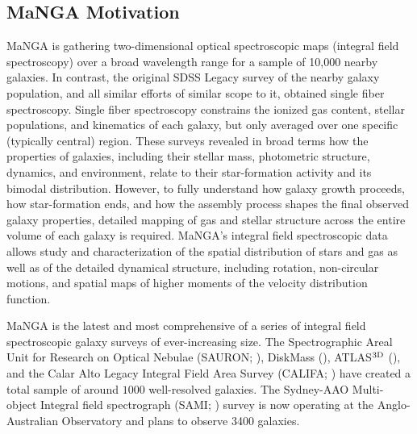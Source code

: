 \subsection{MaNGA Motivation} 

MaNGA is gathering two-dimensional optical spectroscopic maps
(integral field spectroscopy) over a broad wavelength range for a
sample of 10,000 nearby galaxies. In contrast, the original SDSS
Legacy survey of the nearby galaxy population, and all similar efforts
of similar scope to it, obtained single fiber spectroscopy. Single
fiber spectroscopy constrains the ionized gas content, stellar
populations, and kinematics of each galaxy, but only averaged over one
specific (typically central) region. These surveys revealed in broad
terms how the properties of galaxies, including their stellar mass,
photometric structure, dynamics, and environment, relate to their
star-formation activity and its bimodal distribution.  However, to
fully understand how galaxy growth proceeds, how star-formation ends,
and how the assembly process shapes the final observed galaxy
properties, detailed mapping of gas and stellar structure across the
entire volume of each galaxy is required. MaNGA's integral field
spectroscopic data allows study and characterization of the spatial
distribution of stars and gas as well as of the detailed dynamical
structure, including rotation, non-circular motions, and spatial maps
of higher moments of the velocity distribution function.

MaNGA is the latest and most comprehensive of a series of integral
field spectroscopic galaxy surveys of ever-increasing size. The
Spectrographic Areal Unit for Research on Optical Nebulae (SAURON;
\citealt{dezeeuw02a}), DiskMass (\citealt{bershady10a}), ATLAS$^{\rm
  3D}$ (\citealt{cappellari11a}), and the Calar Alto Legacy Integral
Field Area Survey (CALIFA; \citealt{sanchez11a}) have created a total
sample of around $1000$ well-resolved galaxies. The Sydney-AAO
Multi-object Integral field spectrograph (SAMI; \citealt{croom12a})
survey is now operating at the Anglo-Australian Observatory and plans
to observe 3400 galaxies.

